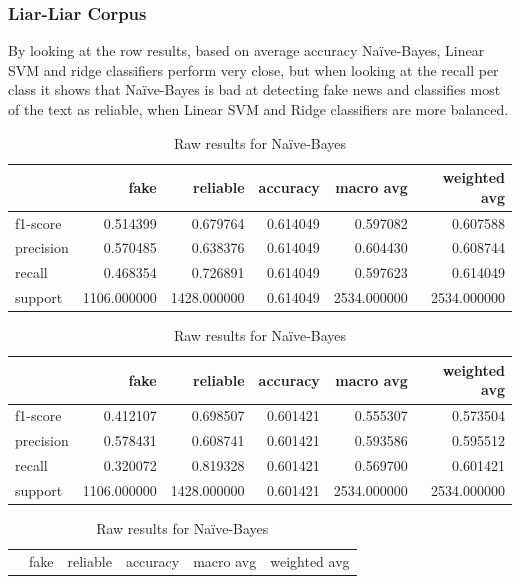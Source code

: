\subsubsection{Liar-Liar Corpus}
By looking at the row results, based on average accuracy Na\"{i}ve-Bayes, Linear SVM and ridge classifiers perform very close, but when looking at the recall per class it shows that Na\"{i}ve-Bayes is bad at detecting fake news and classifies most of the text as reliable, when Linear SVM and Ridge classifiers are more balanced. 
\begin{table}
\begin{subtable}{\textwidth}
\begin{tabular}{lrrrrr}
\toprule
{} &         fake &     reliable &  accuracy &    macro avg &  weighted avg \\
\midrule
f1-score  &     0.514399 &     0.679764 &  0.614049 &     0.597082 &      0.607588 \\
precision &     0.570485 &     0.638376 &  0.614049 &     0.604430 &      0.608744 \\
recall    &     0.468354 &     0.726891 &  0.614049 &     0.597623 &      0.614049 \\
support   &  1106.000000 &  1428.000000 &  0.614049 &  2534.000000 &   2534.000000 \\
\bottomrule
\end{tabular}
\caption{Raw results for Linear SVM}
\end{subtable}
\begin{subtable}{\textwidth}
\begin{tabular}{lrrrrr}
\toprule
{} &         fake &     reliable &  accuracy &    macro avg &  weighted avg \\
\midrule
f1-score  &     0.412107 &     0.698507 &  0.601421 &     0.555307 &      0.573504 \\
precision &     0.578431 &     0.608741 &  0.601421 &     0.593586 &      0.595512 \\
recall    &     0.320072 &     0.819328 &  0.601421 &     0.569700 &      0.601421 \\
support   &  1106.000000 &  1428.000000 &  0.601421 &  2534.000000 &   2534.000000 \\
\bottomrule
\end{tabular}
\caption{Raw results for Na\"{i}ve-Bayes}
\end{subtable}
\begin{subtable}{\textwidth}
\begin{tabular}{lrrrrr}
\toprule
{} &         fake &     reliable &  accuracy &    macro avg &  weighted avg \\

\end{tabular}
\end{subtable}
\end{table}
